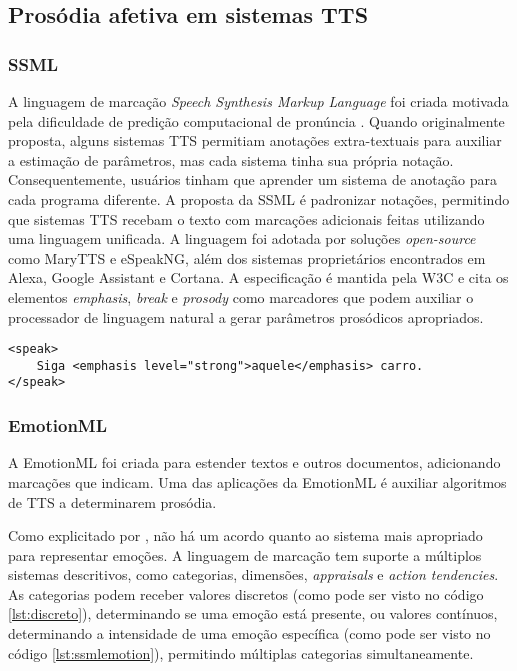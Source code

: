 \subsection{Prosódia afetiva em sistemas TTS}
\label{prosafe}
\subsubsection{SSML}
A linguagem de marcação \emph{Speech Synthesis Markup Language} foi criada
motivada pela dificuldade de predição computacional de pronúncia
\cite{ssmlpaper}. Quando originalmente proposta, alguns sistemas TTS
permitiam anotações extra-textuais para auxiliar a estimação de parâmetros, mas
cada sistema tinha sua própria notação. Consequentemente, usuários tinham que
aprender um sistema de anotação para cada programa diferente. A proposta da SSML
é padronizar notações, permitindo que sistemas TTS recebam o texto com marcações
adicionais feitas utilizando uma linguagem unificada. A linguagem foi adotada
por soluções \emph{open-source} como MaryTTS e eSpeakNG, além dos sistemas
proprietários encontrados em Alexa, Google Assistant e Cortana. A especificação
é mantida pela W3C \cite{ssml} e cita os elementos \emph{emphasis}, \emph{break}
e \emph{prosody} como marcadores que podem auxiliar o processador de linguagem
natural a gerar parâmetros prosódicos apropriados.

\begin{lstlisting}[caption=Exemplo de texto anotado com SSML]
<speak>
    Siga <emphasis level="strong">aquele</emphasis> carro.
</speak> 
\end{lstlisting}

\subsubsection{EmotionML}
A EmotionML \cite{emotionml} foi criada para estender textos e outros
documentos, adicionando marcações que indicam. Uma das aplicações da EmotionML é
auxiliar algoritmos de TTS a determinarem prosódia. 

Como explicitado por \cite{taylor2009}, não há um acordo quanto ao sistema mais
apropriado para representar emoções. A linguagem de marcação tem suporte a
múltiplos sistemas descritivos, como categorias, dimensões, \emph{appraisals} e \emph{action tendencies}. As categorias podem receber valores discretos (como pode ser
visto no código \ref{lst:discreto}), determinando se uma emoção está presente, ou
valores contínuos, determinando a intensidade de uma emoção específica (como
pode ser visto no código \ref{lst:ssmlemotion}), permitindo múltiplas categorias
simultaneamente.

